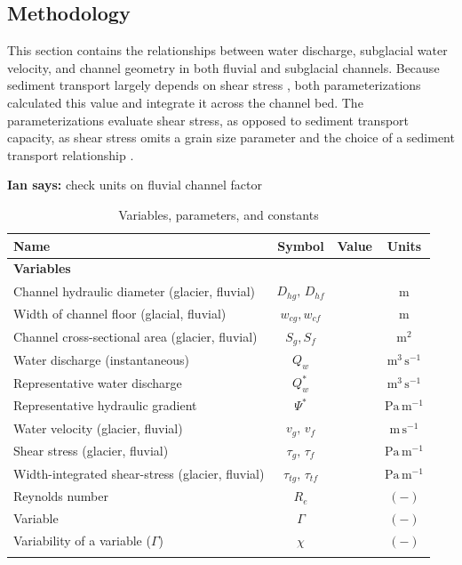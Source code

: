 \documentclass[11pt]{article}
\newcommand{\ian}[1]{{\textbf{\color{blue}Ian says:} \color{blue} #1} }
\begin{document}
\begin{spacing}{1}
  \section{Methodology}
  \label{sect:meth}
  This section contains the relationships between water discharge, subglacial water velocity, and channel geometry in both fluvial and subglacial channels.
  Because sediment transport largely depends on shear stress \citep{shields1936}, both parameterizations calculated this value and integrate  it across the channel bed.
  The parameterizations evaluate shear stress, as opposed to sediment transport capacity, as shear stress omits a grain size parameter and the choice of a sediment transport relationship \citep{shields1936}.

  \ian{check units on fluvial channel factor}
  \begin{table}[H]
    \centering
    \caption{Variables, parameters, and constants }
    \begin{tabular}{ l  c  c c }
      Name &Symbol&  Value&Units \\ \hline
      \textbf{Variables}  & & & \\
      Channel hydraulic diameter (glacier, fluvial) &  $D_{hg},\,D_{hf}$&  & $\mathrm{m}$     \\
      Width of channel floor (glacial, fluvial) & $w_{cg},w_{cf}$&  & $\mathrm{m}$     \\
      Channel cross-sectional area (glacier, fluvial) &  $S_g, S_f$& & $\mathrm{m^2}$     \\
      Water discharge (instantaneous) & $Q_w$& & $\mathrm{m^{3}\,s^{-1}}$ \\
      Representative water discharge & $Q_{w}^*$& & $\mathrm{m^{3}\,s^{-1}}$ \\
      Representative hydraulic gradient  &$\Psi^*$ & & $\mathrm{Pa\, m^{-1}}$\\
      Water velocity (glacier, fluvial)  & $v_g,\,v_{f}$& & $\mathrm{m\,s^{-1}}$ \\
      Shear stress (glacier, fluvial) & $\tau_g,\,\tau_f$&& $\mathrm{Pa \, m^{-1}}$ \\
      Width-integrated shear-stress (glacier, fluvial) & $\tau_{tg},\, \tau_{tf}$&& $\mathrm{Pa \, m^{-1}}$ \\
      Reynolds number &$R_e$& & $\mathrm{(-)}$\\
      Variable &$\Gamma$&&$\mathrm{(-)}$\\
      Variability of a variable ($\Gamma$) &$\chi$& &$\mathrm{(-)}$\\
           &&&\\
      

\end{tabular}
\end{table}
\end{spacing}
\end{document}
